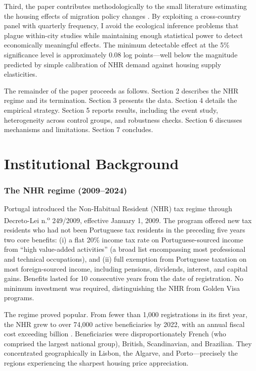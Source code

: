 \documentclass[12pt]{article}
\begin{document}
Third, the paper contributes methodologically to the small literature estimating the housing effects of migration policy changes \citep{saiz2007immigration, gonzalez2013housing, howard2020immigration}. By exploiting a cross-country panel with quarterly frequency, I avoid the ecological inference problems that plague within-city studies while maintaining enough statistical power to detect economically meaningful effects. The minimum detectable effect at the 5\% significance level is approximately 0.08 log points---well below the magnitude predicted by simple calibration of NHR demand against housing supply elasticities.

The remainder of the paper proceeds as follows. Section 2 describes the NHR regime and its termination. Section 3 presents the data. Section 4 details the empirical strategy. Section 5 reports results, including the event study, heterogeneity across control groups, and robustness checks. Section 6 discusses mechanisms and limitations. Section 7 concludes.


\section{Institutional Background}

\subsubsection*{The NHR regime (2009--2024)} Portugal introduced the Non-Habitual Resident (NHR) tax regime through Decreto-Lei n.\textsuperscript{o} 249/2009, effective January 1, 2009. The program offered new tax residents who had not been Portuguese tax residents in the preceding five years two core benefits: (i) a flat 20\% income tax rate on Portuguese-sourced income from ``high value-added activities'' (a broad list encompassing most professional and technical occupations), and (ii) full exemption from Portuguese taxation on most foreign-sourced income, including pensions, dividends, interest, and capital gains. Benefits lasted for 10 consecutive years from the date of registration. No minimum investment was required, distinguishing the NHR from Golden Visa programs.

The regime proved popular. From fewer than 1,000 registrations in its first year, the NHR grew to over 74,000 active beneficiaries by 2022, with an annual fiscal cost exceeding  billion \citep{pt_budget_2024}. Beneficiaries were disproportionately French (who comprised the largest national group), British, Scandinavian, and Brazilian. They concentrated geographically in Lisbon, the Algarve, and Porto---precisely the regions experiencing the sharpest housing price appreciation.
\end{document}

